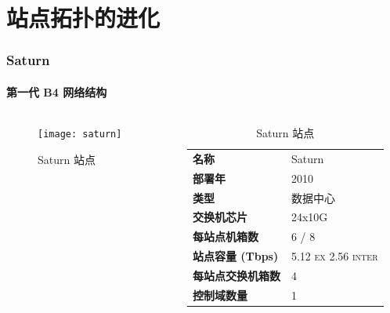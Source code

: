 \section{站点拓扑的进化}

\begin{frame}
    \frametitle{Saturn}
    \framesubtitle{第一代 B4 网络结构}
    \begin{columns}
        \begin{column}{0.4\textwidth}
            \begin{figure}
                \texttt{[image: saturn]}
                \caption{Saturn 站点}
            \end{figure}
        \end{column}
        \begin{column}{0.6\textwidth}
            \begin{table}
                \begin{tabular}{>{\bfseries}ll}
                    \toprule
                    名称             & Saturn                               \\
                    部署年           & 2010                                 \\
                    类型             & 数据中心                             \\
                    交换机芯片       & 24x10G                               \\
                    每站点机箱数     & 6 / 8                                \\
                    站点容量 (Tbps)  & 5.12 \textsc{ex} 2.56 \textsc{inter} \\
                    每站点交换机箱数 & 4                                    \\
                    控制域数量       & 1                                    \\
                    \bottomrule
                \end{tabular}
                \caption{Saturn 站点}\label{tab:saturn}
            \end{table}
        \end{column}
    \end{columns}
\end{frame}

